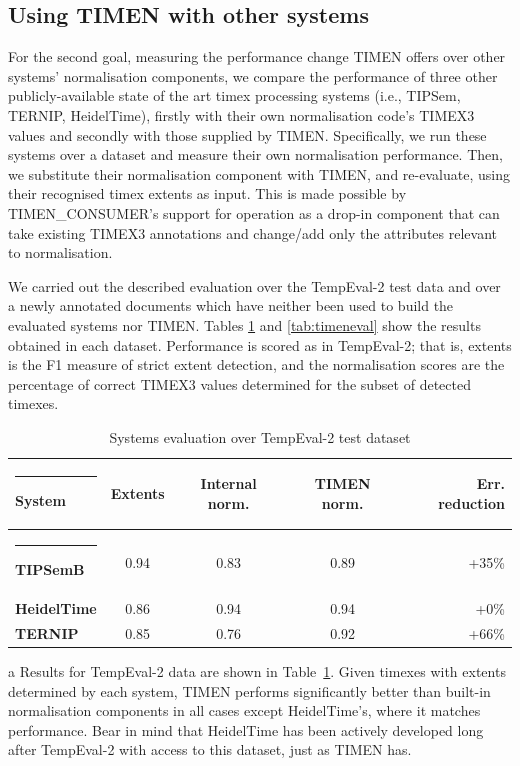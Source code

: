 \documentclass[10pt, a4paper]{article}
\begin{document}
\subsection{Using TIMEN with other systems}

For the second goal, measuring the performance change TIMEN offers over other systems' normalisation components, we compare the performance of three other publicly-available state of the art timex processing systems (i.e., TIPSem, TERNIP, HeidelTime), firstly with their own normalisation code's TIMEX3 values and secondly with those supplied by TIMEN. Specifically, we run these systems over a dataset and measure their own normalisation performance. Then, we substitute their normalisation component with TIMEN, and re-evaluate, using their recognised timex extents as input. This is made possible by TIMEN\_CONSUMER's support for operation as a drop-in component that can take existing TIMEX3 annotations and change/add only the attributes relevant to normalisation.

We carried out the described evaluation over the TempEval-2 test data and over a newly annotated documents which have neither been used to build the evaluated systems nor TIMEN. Tables \ref{tab:TE2} and \ref{tab:timeneval} show the results obtained in each dataset. Performance is scored as in TempEval-2; that is, extents is the F1 measure of strict extent detection, and the normalisation scores are the percentage of correct TIMEX3 values determined for the subset of detected timexes.


\begin{table} [htb]
\begin{footnotesize}
\begin{center}
\begin{tabular} {lcccr}
  \hline\rule{-2pt}{8pt}
  {\bf System} & {\bf Extents} & {\bf Internal norm.} & {\bf TIMEN norm.} & {\bf Err. reduction}\\
  \hline\rule{-2pt}{8pt}
  {\bf TIPSemB} 	& 0.94	& 0.83	& 0.89	& +35\% \\
  {\bf HeidelTime} 	& 0.86	& 0.94	& 0.94  & +0\%  \\
  {\bf TERNIP} 		& 0.85 	& 0.76	& 0.92	& +66\% \\
  \hline
\end{tabular}
\caption{Systems evaluation over TempEval-2 test dataset} \label{tab:TE2}
\end{center}
\end{footnotesize}
\end{table}
a
Results for TempEval-2 data are shown in Table~\ref{tab:TE2}. Given timexes with extents determined by each system, TIMEN performs significantly better than built-in normalisation components in all cases except HeidelTime's, where it matches performance. Bear in mind that HeidelTime has been actively developed long after TempEval-2 with access to this dataset, just as TIMEN has.
\end{document}
